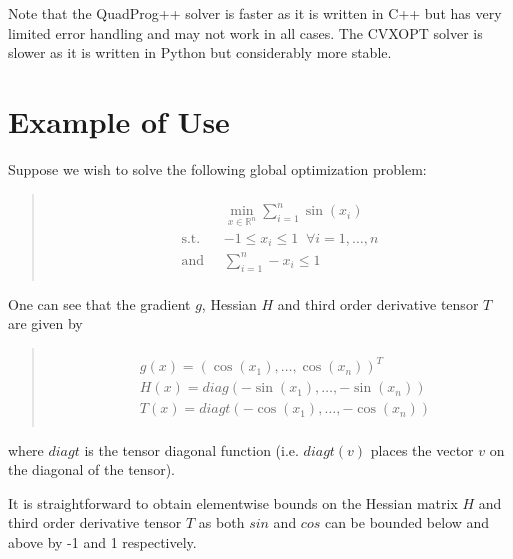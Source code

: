 \documentclass[letterpaper,11pt,openany,oneside]{sphinxmanual}
\begin{document}
Note that the QuadProg++ solver is faster as it is written in C++ but has very limited error handling and may not work in all cases. The CVXOPT solver is slower as it is written in Python but considerably more stable.


\section{Example of Use}
\label{userguide:example-of-use}
Suppose we wish to solve the following global optimization problem:
\begin{quote}
\begin{align*}\begin{aligned}
\begin{split}&\min_{x \in \mathbb{R}^n} \sum_{i=1}^n \sin(x_i) \\
\text{s.t. } \; &-1 \le x_i \le 1 \; \; \forall i=1,\dotsc,n \\
\text{and }  \; &\sum_{i=1}^n -x_i \le 1\end{split}\end{aligned}\end{align*}\end{quote}

One can see that the gradient \(g\), Hessian \(H\) and third order derivative tensor \(T\) are given by
\begin{quote}
\begin{align*}\begin{aligned}
\begin{split}&g(x) = ( \cos(x_1), \dotsc, \cos(x_n))^T \\
&H(x) = diag( -\sin(x_1), \dotsc, -\sin(x_n)) \\
&T(x) = diagt( -\cos(x_1), \dotsc, -\cos(x_n))\end{split}\end{aligned}\end{align*}\end{quote}

where \(diagt\) is the tensor diagonal function (i.e. \(diagt(v)\) places the vector \(v\) on the diagonal of the tensor).

It is straightforward to obtain elementwise bounds on the Hessian matrix \(H\) and third order derivative tensor \(T\) as both \(sin\) and \(cos\) can be bounded below and above by -1 and 1 respectively.
\end{document}

